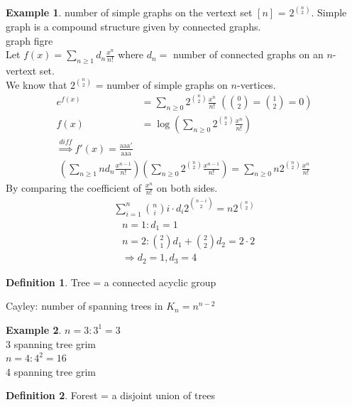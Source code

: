 \documentclass{article}
\theoremstyle{definition}
\newtheorem{defn}{Definition}[]
\newtheorem{ex}{Example}[]
\begin{document}
\begin{ex}
    number of simple graphs on the vertext set $[n]$ = $2^{n \choose 2}$. Simple
    graph is a compound structure given by connected graphs. \\ 
    graph figre\\ 
    Let $f(x) = \sum_{n\ge 1} d_n \frac{x^n}{n!}$ where $d_n = $ number of
    connected graphs on an $n$-vertext set. \\
    We know that $2^{n \choose 2}$ = number of simple graphs on $n$-vertices.
    \begin{align*}
        e^{f(x)} &= \sum_{n\ge 0} 2^{{n \choose 2}} \frac{x^n}{n!} \; 
        \left({0 \choose 2} = {1 \choose 2} = 0\right) \\ 
        f(x) &= \log \left( \sum_{n\ge 0} 2^{{n \choose 2}} \frac{x^n}{n!} \right) \\ 
        \overset{diff}{\Rightarrow} f'(x) = \frac{\text{aaa}'}{\text{aaa} }
    \end{align*}  
    \begin{align*}
        \left(\sum_{n\ge 1} n d_n \frac{x^{n-1}}{n!}\right) \left(
            \sum_{n\ge 0} 2^{n \choose 2} \frac{x^{n-1}}{n!} 
        \right) = \sum_{n\ge 0} n 2^{n \choose 2} \frac{x^n}{n!}
    \end{align*}
    By comparing the coefficient of $\frac{x^n}{n!}$ on both sides.
    \begin{align*}
        \sum_{i=1}^n {n \choose i} i \cdot d_i 2^{n-i \choose 2} = n 2^{n \choose 2}
    \end{align*}
    \begin{align*}
        &n = 1 : d_1 = 1 \\
        &n =2  : {2 \choose 1} d_1 + {2 \choose 2} d_2 = 2 \cdot 2 \\ 
        &\Rightarrow d_2 = 1, d_3 = 4
    \end{align*}
\end{ex}
\begin{defn}
    Tree = a connected acyclic group
\end{defn}
Cayley: number of spanning trees in $K_n = n^{n-2}$
\begin{ex}
    $n=3: 3^1 =3$ \\ 
    3 spanning tree grim \\ 
    $n = 4: 4^2 = 16$ \\ 
    4 spanning tree grim 
\end{ex}
\begin{defn}
    Forest = a disjoint union of trees
\end{defn}
\end{document}
